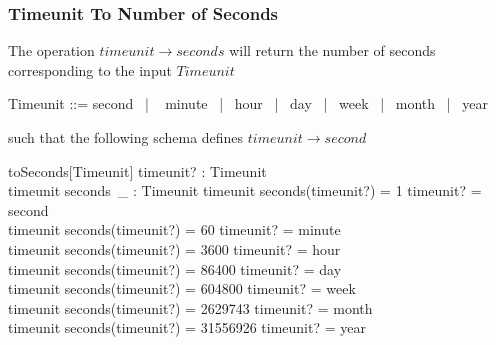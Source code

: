 \documentclass[../../main.tex]{subfiles}
\begin{document}
\subsubsection{Timeunit To Number of Seconds}

The operation $timeunit \to seconds$ will return the number of seconds corresponding to the input $Timeunit$
\begin{zed}
  Timeunit ::= second ~| ~ minute ~| ~hour ~| ~day ~| ~week ~| ~month ~| ~year
\end{zed}
such that the following schema defines $timeunit \to second$
\begin{schema}{toSeconds[Timeunit]}
  timeunit? : Timeunit \\
  timeunit \to seconds~\_ : Timeunit \pfun \nat
  \where
  timeunit \to seconds(timeunit?) = 1 \iff timeunit? = second \\
  timeunit \to seconds(timeunit?) = 60 \iff timeunit? = minute \\
  timeunit \to seconds(timeunit?) = 3600 \iff timeunit? = hour \\
  timeunit \to seconds(timeunit?) = 86400 \iff timeunit? = day \\
  timeunit \to seconds(timeunit?) = 604800 \iff timeunit? = week \\
  timeunit \to seconds(timeunit?) = 2629743 \iff timeunit? = month \\
  timeunit \to seconds(timeunit?) = 31556926 \iff timeunit? = year
\end{schema}
\end{document}
